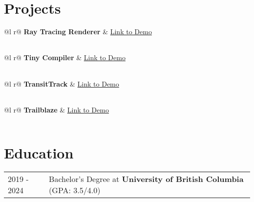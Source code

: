\documentclass[a4paper,12pt]{article}
\begin{document}
\section{Projects}

\begin{tabularx}{\linewidth}{ @{}l r@{} }
\textbf{Ray Tracing Renderer} & \hfill \href{https://github.com/JaydenCWong/RayTracingInOneWeekend}{Link to Demo} \\[3.75pt]
  \\
\end{tabularx}

\begin{tabularx}{\linewidth}{ @{}l r@{} }
\textbf{Tiny Compiler} & \hfill \href{https://github.com/JaydenCWong/RayTracingInOneWeekend}{Link to Demo} \\[3.75pt]
  \\
\end{tabularx}

\begin{tabularx}{\linewidth}{ @{}l r@{} }
\textbf{TransitTrack} & \hfill \href{https://github.com/JaydenCWong/JAAM-project}{Link to Demo} \\[3.75pt]
  \\
\end{tabularx}

\begin{tabularx}{\linewidth}{ @{}l r@{} }
\textbf{Trailblaze} & \hfill \href{https://github.com/JaydenCWong/Trailblaze-Source-Code}{Link to Demo} \\[3.75pt]
  \\
\end{tabularx}
\section{Education}
\begin{tabularx}{\linewidth}{@{}l X@{}}	

2019 - 2024 & Bachelor's Degree at \textbf{University of British Columbia} \hfill (GPA: 3.5/4.0) \\ 

\end{tabularx}
\end{document}
